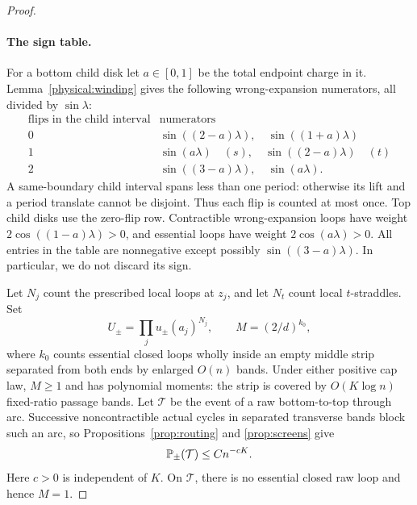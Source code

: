 \begin{proof}
\paragraph{The sign table.}
For a bottom child disk let \(a\in[0,1]\) be the total endpoint
charge in it. Lemma~\ref{physical:winding} gives the following
wrong-expansion numerators, all divided by \(\sin\lambda\):
\begin{equation}\label{physical:charged-table}
 \begin{array}{c|l}
 \text{flips in the child interval}&\text{numerators}\\ \hline
 0&\sin((2-a)\lambda),\quad\sin((1+a)\lambda)\\
 1&\sin(a\lambda)\quad(s),\quad\sin((2-a)\lambda)\quad(t)\\
 2&\sin((3-a)\lambda),\quad\sin(a\lambda).
 \end{array}
\end{equation}
A same-boundary child interval spans less than one period: otherwise
its lift and a period translate cannot be disjoint. Thus each flip
is counted at most once. Top child disks use the zero-flip row.
Contractible wrong-expansion loops have weight
\(2\cos((1-a)\lambda)>0\), and essential loops have weight
\(2\cos(a\lambda)>0\). All entries in the table are nonnegative
except possibly \(\sin((3-a)\lambda)\). In particular, we do not
discard its sign.

Let \(N_j\) count the prescribed local loops at \(z_j\), and
let \(N_t\) count local \(t\)-straddles. Set
\[
 U_\pm=\prod_j u_\pm(a_j)^{N_j},\qquad
 M=(2/d)^{k_0},
\]
where \(k_0\) counts essential closed loops wholly inside an empty
middle strip separated from both ends by enlarged \(O(n)\) bands.
Under either positive cap law, \(M\ge1\) and has polynomial
moments: the strip is covered by \(O(K\log n)\) fixed-ratio
passage bands. Let \(\mathcal T\) be the event of a raw bottom-to-top
through arc. Successive noncontractible actual cycles in separated
transverse bands block such an arc, so Propositions~\ref{prop:routing}
and \ref{prop:screens} give
\begin{equation}\label{physical:through-rarity}
 \mathbb P_\pm(\mathcal T)\le Cn^{-cK}.
\end{equation}
Here \(c>0\) is independent of \(K\). On \(\mathcal T\),
there is no essential closed raw loop and hence \(M=1\).


\end{proof}
